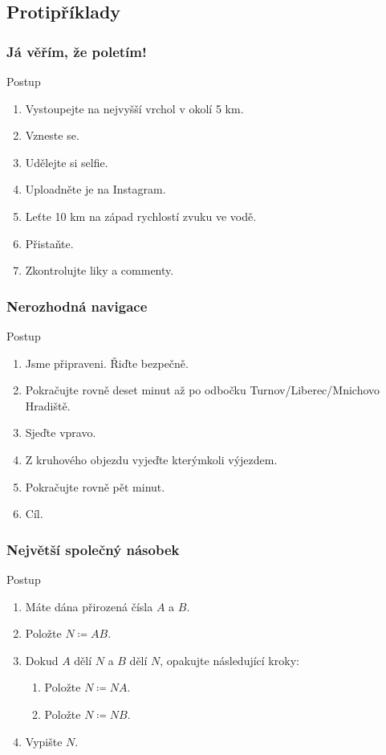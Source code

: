 \documentclass[aspectratio=169,11pt]{beamer}
\begin{document}
\subsection[Protipříklady]{Protipříklady}

\begin{frame}
 \frametitle{Já věřím, že poletím!}
 \begin{block}{Postup}
  \begin{enumerate}
   \item Vystoupejte na nejvyšší vrchol v okolí 5 km.
   \item Vzneste se.
   \item Udělejte si selfie.
   \item Uploadněte je na Instagram.
   \item Leťte 10 km na západ rychlostí zvuku ve vodě.
   \item Přistaňte.
   \item Zkontrolujte liky a commenty.
  \end{enumerate}
 \end{block}
\end{frame}

\begin{frame}
 \frametitle{Nerozhodná navigace}
 \begin{block}{Postup}
  \begin{enumerate}
   \item Jsme připraveni. Řiďte bezpečně.
   \item Pokračujte rovně deset minut až po odbočku Turnov/Liberec/Mnichovo
    Hradiště.
   \item Sjeďte vpravo.
   \item Z kruhového objezdu vyjeďte kterýmkoli výjezdem.
   \item Pokračujte rovně pět minut.
   \item Cíl.
  \end{enumerate}
 \end{block}
\end{frame}

\begin{frame}
 \frametitle{Největší společný násobek}
 \begin{block}{Postup}
  \begin{enumerate}
   \item Máte dána přirozená čísla $A$ a $B$.
   \item Položte $N \coloneqq AB$.
   \item Dokud $A$ dělí $N$ a $B$ dělí $N$, opakujte následující kroky:
    \begin{enumerate}[label=\roman*.]
     \item Položte $N \coloneqq NA$.
     \item Položte $N \coloneqq NB$.
    \end{enumerate}
   \item Vypište $N$.
  \end{enumerate}
 \end{block}
\end{frame}
\end{document}
